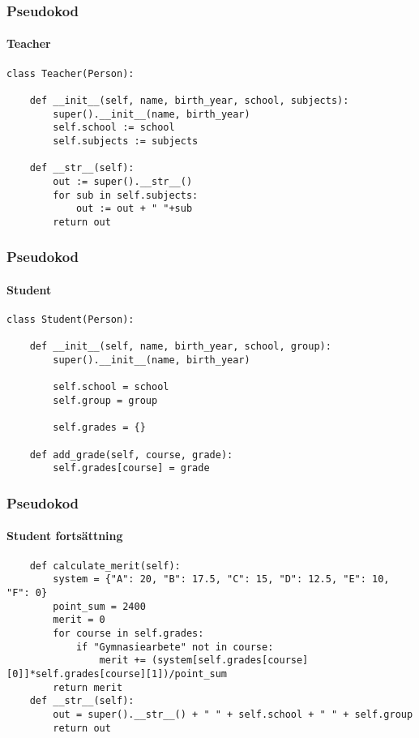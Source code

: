\documentclass[aspectratio=169]{beamer}
\begin{document}
\begin{frame}[fragile]
	\frametitle{Pseudokod}
	\framesubtitle{Teacher}
	
	\begin{lstlisting}
class Teacher(Person):

    def __init__(self, name, birth_year, school, subjects):
        super().__init__(name, birth_year)
        self.school := school
        self.subjects := subjects

    def __str__(self):
        out := super().__str__()
        for sub in self.subjects:
            out := out + " "+sub
        return out
	\end{lstlisting}

\end{frame}

\begin{frame}[fragile]
	\frametitle{Pseudokod}
	\framesubtitle{Student}

	\begin{lstlisting}
class Student(Person):

    def __init__(self, name, birth_year, school, group):
        super().__init__(name, birth_year)
    
        self.school = school
        self.group = group

        self.grades = {}

    def add_grade(self, course, grade):
        self.grades[course] = grade
	\end{lstlisting}

\end{frame}

\begin{frame}[fragile]
	\frametitle{Pseudokod}
	\framesubtitle{Student fortsättning}

	\begin{lstlisting}
    def calculate_merit(self):
        system = {"A": 20, "B": 17.5, "C": 15, "D": 12.5, "E": 10, "F": 0}
        point_sum = 2400
        merit = 0
        for course in self.grades:
            if "Gymnasiearbete" not in course:
                merit += (system[self.grades[course][0]]*self.grades[course][1])/point_sum
        return merit
    def __str__(self):
        out = super().__str__() + " " + self.school + " " + self.group
        return out
	\end{lstlisting}

\end{frame}
\end{document}
